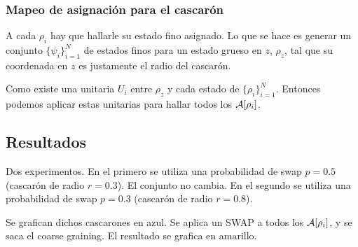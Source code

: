 \subsubsection{Mapeo de asignación para el cascarón}


A cada $\rho_{i}$ hay que hallarle su estado fino asignado. Lo que se hace es generar un conjunto $\{\psi_{i}\}_{i=1}^{N}$ de estados finos para un estado grueso en $z$, $\rho_{z}$, tal que su coordenada en $z$ es justamente el radio del cascarón.

Como existe una unitaria $U_{i}$ entre $\rho_{z}$ y cada estado de $\{\rho_{i}\}_{i=1}^{N}$. Entonces podemos aplicar estas unitarias para hallar todos los $\mathcal{A}[\rho_{i}]$.

\subsection{Resultados}

Dos experimentos. En el primero se utiliza una probabilidad de swap $p=0.5$ (cascarón de radio $r=0.3$). El conjunto no cambia. En el segundo se utiliza una probabilidad de swap $p=0.3$ (cascarón de radio $r=0.8$).

Se grafican dichos cascarones en azul. Se aplica un SWAP a todos los $\mathcal{A}[\rho_{i}]$, y se saca el coarse graining. El resultado se grafica en amarillo.

